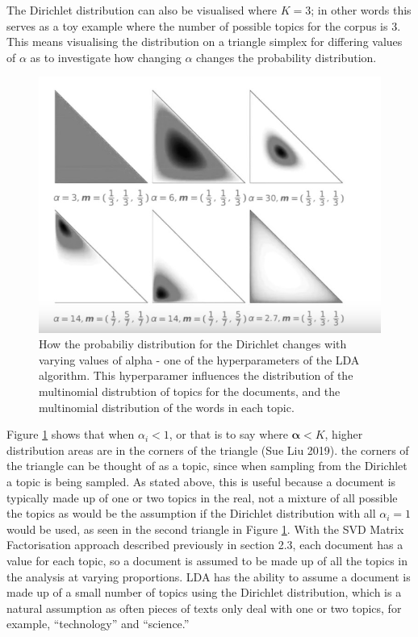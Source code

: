 \documentclass[
]{article}
\begin{document}
The Dirichlet distribution can also be visualised where \(K=3\); in
other words this serves as a toy example where the number of possible
topics for the corpus is 3. This means visualising the distribution on a
triangle simplex for differing values of \(\alpha\) as to investigate
how changing \(\alpha\) changes the probability distribution.

\begin{figure}

{\centering \includegraphics[width=1\linewidth]{images/dirichlet2} 

}

\caption{How the probabiliy distribution for the Dirichlet changes with varying values of alpha - one of the hyperparameters of the LDA algorithm. This hyperparamer influences the distribution of the  multinomial distrubtion of topics for the documents, and the multinomial distribution of the words in each topic.}\label{fig:dirivis2}
\end{figure}

Figure \ref{fig:dirivis2} shows that when \(\alpha_i < 1\), or that is
to say where \(\boldsymbol{\alpha} < K\), higher distribution areas are
in the corners of the triangle (Sue Liu 2019). the corners of the
triangle can be thought of as a topic, since when sampling from the
Dirichlet a topic is being sampled. As stated above, this is useful
because a document is typically made up of one or two topics in the
real, not a mixture of all possible the topics as would be the
assumption if the Dirichlet distribution with all \(\alpha_i = 1\) would
be used, as seen in the second triangle in Figure \ref{fig:dirivis2}.
With the SVD Matrix Factorisation approach described previously in
section 2.3, each document has a value for each topic, so a document is
assumed to be made up of all the topics in the analysis at varying
proportions. LDA has the ability to assume a document is made up of a
small number of topics using the Dirichlet distribution, which is a
natural assumption as often pieces of texts only deal with one or two
topics, for example, ``technology'' and ``science.''
\end{document}
